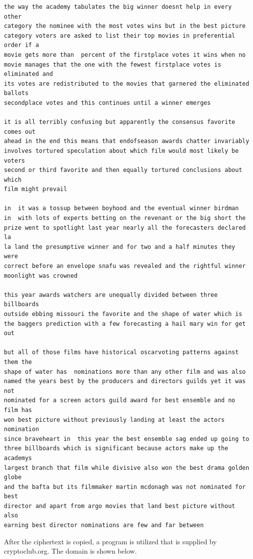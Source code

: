 \documentclass[12pt]{article}
\begin{document}
\begin{verbatim}
the way the academy tabulates the big winner doesnt help in every other
category the nominee with the most votes wins but in the best picture
category voters are asked to list their top movies in preferential order if a
movie gets more than  percent of the firstplace votes it wins when no
movie manages that the one with the fewest firstplace votes is eliminated and
its votes are redistributed to the movies that garnered the eliminated ballots
secondplace votes and this continues until a winner emerges

it is all terribly confusing but apparently the consensus favorite comes out
ahead in the end this means that endofseason awards chatter invariably
involves tortured speculation about which film would most likely be voters
second or third favorite and then equally tortured conclusions about which
film might prevail

in  it was a tossup between boyhood and the eventual winner birdman
in  with lots of experts betting on the revenant or the big short the
prize went to spotlight last year nearly all the forecasters declared la
la land the presumptive winner and for two and a half minutes they were
correct before an envelope snafu was revealed and the rightful winner
moonlight was crowned

this year awards watchers are unequally divided between three billboards
outside ebbing missouri the favorite and the shape of water which is
the baggers prediction with a few forecasting a hail mary win for get out

but all of those films have historical oscarvoting patterns against them the
shape of water has  nominations more than any other film and was also
named the years best by the producers and directors guilds yet it was not
nominated for a screen actors guild award for best ensemble and no film has
won best picture without previously landing at least the actors nomination
since braveheart in  this year the best ensemble sag ended up going to
three billboards which is significant because actors make up the academys
largest branch that film while divisive also won the best drama golden globe
and the bafta but its filmmaker martin mcdonagh was not nominated for best
director and apart from argo movies that land best picture without also
earning best director nominations are few and far between
\end{verbatim}

After the ciphertext is copied, a program is utilized that is supplied by cryptoclub.org. The domain is shown below.
\end{document}

